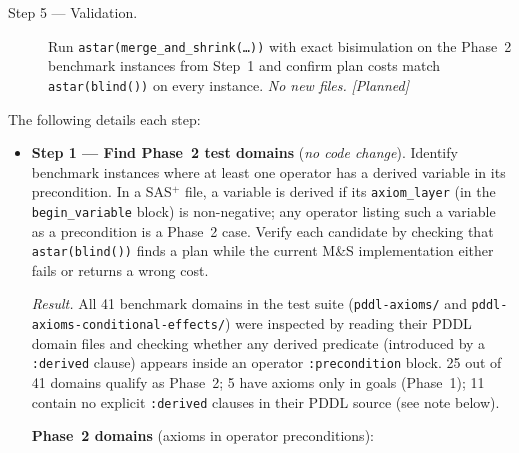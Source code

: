 \documentclass[11pt,a4paper]{article}
\begin{document}
\begin{description}
  \item[Step 5 — Validation.]
    Run \texttt{astar(merge\_and\_shrink(\ldots))} with exact bisimulation
    on the Phase~2 benchmark instances from Step~1 and confirm plan costs
    match \texttt{astar(blind())} on every instance.
    \emph{No new files.}  \textit{[Planned]}
\end{description}

\bigskip

The following details each step:

\begin{itemize}
  \item \textbf{Step 1 — Find Phase~2 test domains}
    (\textit{no code change}).
    Identify benchmark instances where at least one operator has a derived
    variable in its precondition.  In a SAS$^+$ file, a variable is derived if
    its \texttt{axiom\_layer} (in the \texttt{begin\_variable} block) is
    non-negative; any operator listing such a variable as a precondition is a
    Phase~2 case.  Verify each candidate by checking that \texttt{astar(blind())}
    finds a plan while the current M\&S implementation either fails or returns a
    wrong cost.

    \medskip
    \noindent\textit{Result.}  All 41 benchmark domains in the test suite
    (\texttt{pddl-axioms/} and \texttt{pddl-axioms-conditional-effects/}) were
    inspected by reading their PDDL domain files and checking whether any derived
    predicate (introduced by a \texttt{:derived} clause) appears inside an
    operator \texttt{:precondition} block.  25 out of 41 domains qualify as
    Phase~2; 5 have axioms only in goals (Phase~1); 11 contain no explicit
    \texttt{:derived} clauses in their PDDL source (see note below).

    \medskip
    \noindent\textbf{Phase~2 domains} (axioms in operator preconditions):


\end{itemize}
\end{document}
